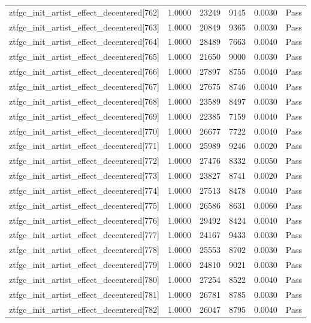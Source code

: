 \begin{table}[htbp]
\begin{tabular}{llrrll}
ztfgc\_init\_artist\_effect\_decentered[762] & 1.0000 & 23249 & 9145 & 0.0030 & Pass \\
ztfgc\_init\_artist\_effect\_decentered[763] & 1.0000 & 20849 & 9365 & 0.0030 & Pass \\
ztfgc\_init\_artist\_effect\_decentered[764] & 1.0000 & 28489 & 7663 & 0.0040 & Pass \\
ztfgc\_init\_artist\_effect\_decentered[765] & 1.0000 & 21650 & 9000 & 0.0030 & Pass \\
ztfgc\_init\_artist\_effect\_decentered[766] & 1.0000 & 27897 & 8755 & 0.0040 & Pass \\
ztfgc\_init\_artist\_effect\_decentered[767] & 1.0000 & 27675 & 8746 & 0.0040 & Pass \\
ztfgc\_init\_artist\_effect\_decentered[768] & 1.0000 & 23589 & 8497 & 0.0030 & Pass \\
ztfgc\_init\_artist\_effect\_decentered[769] & 1.0000 & 22385 & 7159 & 0.0040 & Pass \\
ztfgc\_init\_artist\_effect\_decentered[770] & 1.0000 & 26677 & 7722 & 0.0040 & Pass \\
ztfgc\_init\_artist\_effect\_decentered[771] & 1.0000 & 25989 & 9246 & 0.0020 & Pass \\
ztfgc\_init\_artist\_effect\_decentered[772] & 1.0000 & 27476 & 8332 & 0.0050 & Pass \\
ztfgc\_init\_artist\_effect\_decentered[773] & 1.0000 & 23827 & 8741 & 0.0020 & Pass \\
ztfgc\_init\_artist\_effect\_decentered[774] & 1.0000 & 27513 & 8478 & 0.0040 & Pass \\
ztfgc\_init\_artist\_effect\_decentered[775] & 1.0000 & 26586 & 8631 & 0.0060 & Pass \\
ztfgc\_init\_artist\_effect\_decentered[776] & 1.0000 & 29492 & 8424 & 0.0040 & Pass \\
ztfgc\_init\_artist\_effect\_decentered[777] & 1.0000 & 24167 & 9433 & 0.0030 & Pass \\
ztfgc\_init\_artist\_effect\_decentered[778] & 1.0000 & 25553 & 8702 & 0.0030 & Pass \\
ztfgc\_init\_artist\_effect\_decentered[779] & 1.0000 & 24810 & 9021 & 0.0030 & Pass \\
ztfgc\_init\_artist\_effect\_decentered[780] & 1.0000 & 27254 & 8522 & 0.0040 & Pass \\
ztfgc\_init\_artist\_effect\_decentered[781] & 1.0000 & 26781 & 8785 & 0.0030 & Pass \\
ztfgc\_init\_artist\_effect\_decentered[782] & 1.0000 & 26047 & 8795 & 0.0040 & Pass \\

\end{tabular}
\end{table}
